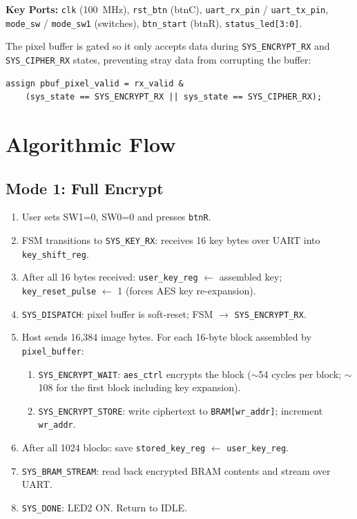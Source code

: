 \documentclass[12pt,a4paper]{article}
\begin{document}
\textbf{Key Ports:} \texttt{clk} (100~MHz), \texttt{rst\_btn} (btnC), \texttt{uart\_rx\_pin} / \texttt{uart\_tx\_pin}, \texttt{mode\_sw} / \texttt{mode\_sw1} (switches), \texttt{btn\_start} (btnR), \texttt{status\_led[3:0]}.

The pixel buffer is gated so it only accepts data during \texttt{SYS\_ENCRYPT\_RX} and \texttt{SYS\_CIPHER\_RX} states, preventing stray data from corrupting the buffer:

\begin{lstlisting}
assign pbuf_pixel_valid = rx_valid &
    (sys_state == SYS_ENCRYPT_RX || sys_state == SYS_CIPHER_RX);
\end{lstlisting}


\section{Algorithmic Flow}

\subsection{Mode 1: Full Encrypt}

\begin{enumerate}[leftmargin=*, label=\textbf{Step \arabic*.}]
\item User sets SW1=0, SW0=0 and presses \texttt{btnR}.
\item FSM transitions to \texttt{SYS\_KEY\_RX}: receives 16 key bytes over UART into \texttt{key\_shift\_reg}.
\item After all 16 bytes received: \texttt{user\_key\_reg} $\leftarrow$ assembled key; \texttt{key\_reset\_pulse} $\leftarrow$ 1 (forces AES key re-expansion).
\item \texttt{SYS\_DISPATCH}: pixel buffer is soft-reset; FSM $\to$ \texttt{SYS\_ENCRYPT\_RX}.
\item Host sends 16,384 image bytes. For each 16-byte block assembled by \texttt{pixel\_buffer}:
  \begin{enumerate}[label=\alph*.]
    \item \texttt{SYS\_ENCRYPT\_WAIT}: \texttt{aes\_ctrl} encrypts the block ($\sim$54 cycles per block; $\sim$108 for the first block including key expansion).
    \item \texttt{SYS\_ENCRYPT\_STORE}: write ciphertext to \texttt{BRAM[wr\_addr]}; increment \texttt{wr\_addr}.
  \end{enumerate}
\item After all 1024 blocks: save \texttt{stored\_key\_reg} $\leftarrow$ \texttt{user\_key\_reg}.
\item \texttt{SYS\_BRAM\_STREAM}: read back encrypted BRAM contents and stream over UART.
\item \texttt{SYS\_DONE}: LED2 ON. Return to IDLE.
\end{enumerate}
\end{document}
